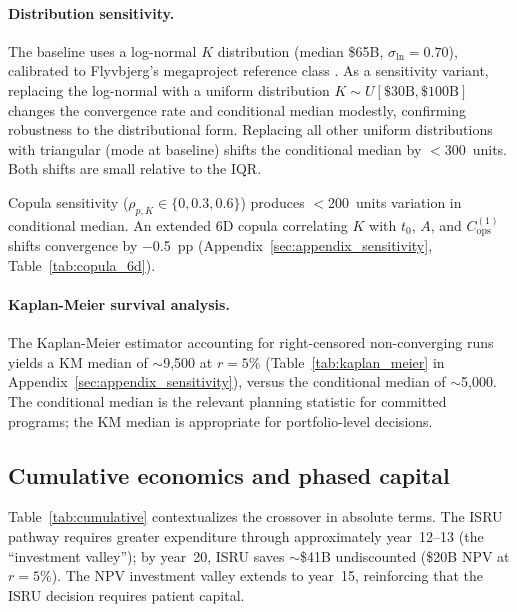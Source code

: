 \documentclass[preprint,12pt]{elsarticle}
\begin{document}
\paragraph{Distribution sensitivity.} The baseline uses a log-normal $K$ distribution (median \$65B, $\sigma_{\ln} = 0.70$), calibrated to Flyvbjerg's megaproject reference class \cite{flyvbjerg2014}. As a sensitivity variant, replacing the log-normal with a uniform distribution $K \sim U[\$30\text{B}, \$100\text{B}]$ changes the convergence rate and conditional median modestly, confirming robustness to the distributional form. Replacing all other uniform distributions with triangular (mode at baseline) shifts the conditional median by $<$300~units. Both shifts are small relative to the IQR.

Copula sensitivity ($\rho_{p,K} \in \{0, 0.3, 0.6\}$) produces $<$200~units variation in conditional median. An extended 6D copula correlating $K$ with $t_0$, $A$, and $C_{\mathrm{ops}}^{(1)}$ shifts convergence by $-$0.5~pp (Appendix~\ref{sec:appendix_sensitivity}, Table~\ref{tab:copula_6d}).

\paragraph{Kaplan-Meier survival analysis.} The Kaplan-Meier estimator \cite{kaplan1958} accounting for right-censored non-converging runs yields a KM median of $\sim$9{,}500 at $r = 5\%$ (Table~\ref{tab:kaplan_meier} in Appendix~\ref{sec:appendix_sensitivity}), versus the conditional median of $\sim$5{,}000. The conditional median is the relevant planning statistic for committed programs; the KM median is appropriate for portfolio-level decisions.

\subsection{Cumulative economics and phased capital}
\label{sec:phased_capital}

Table~\ref{tab:cumulative} contextualizes the crossover in absolute terms. The ISRU pathway requires greater expenditure through approximately year~12--13 (the ``investment valley''); by year~20, ISRU saves $\sim$\$41B undiscounted (\$20B NPV at $r = 5\%$). The NPV investment valley extends to year~15, reinforcing that the ISRU decision requires patient capital.
\end{document}
